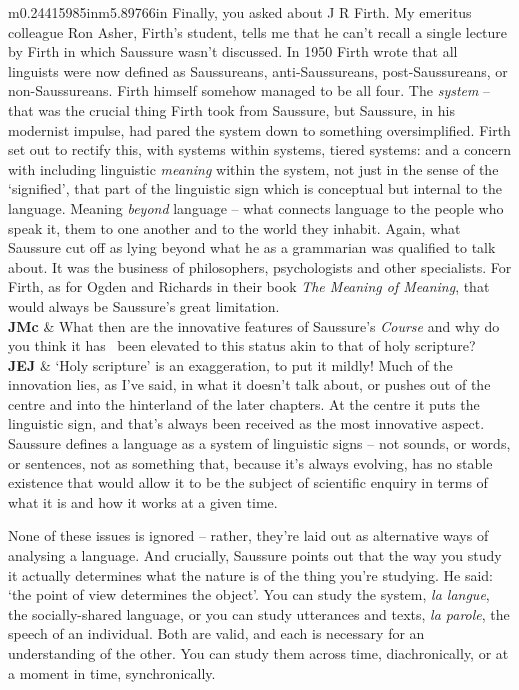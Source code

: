 \documentclass[12pt]{article}
\begin{document}
\begin{flushleft}
\begin{supertabular}{m{0.24415985in}m{5.89766in}}
Finally, you asked about J R Firth. My emeritus colleague Ron Asher, Firth’s student, tells me that he can’t recall a single lecture by Firth in which Saussure wasn’t discussed. In 1950 Firth wrote that all linguists were now defined as Saussureans, anti-Saussureans, post-Saussureans, or non-Saussureans. Firth himself somehow managed to be all four. The \textit{system} – that was the crucial thing Firth took from Saussure, but Saussure, in his modernist impulse, had pared the system down to something oversimplified. Firth set out to rectify this, with systems within systems, tiered systems: and a concern with including linguistic \textit{meaning} within the system, not just in the sense of the ‘signified’, that part of the linguistic sign which is conceptual but internal to the language. Meaning \textit{beyond} language – what connects language to the people who speak it, them to one another and to the world they inhabit. Again, what Saussure cut off as lying beyond what he as a grammarian was qualified to talk about. It was the business of philosophers, psychologists and other specialists. For Firth, as for Ogden and Richards in their book \textit{The Meaning of Meaning}, that would always be Saussure’s great limitation.\\
\textbf{JMc}\newline
 &
What then are the innovative features of Saussure’s \textit{Course} and why do you think it has \ been elevated to this status akin to that of holy scripture?\\
\textbf{JEJ}\newline
 &
‘Holy scripture’ is an exaggeration, to put it mildly! Much of the innovation lies, as I’ve said, in what it doesn’t talk about, or pushes out of the centre and into the hinterland of the later chapters. At the centre it puts the linguistic sign, and that’s always been received as the most innovative aspect. Saussure defines a language as a system of linguistic signs – not sounds, or words, or sentences, not as something that, because it’s always evolving, has no stable existence that would allow it to be the subject of scientific enquiry in terms of what it is and how it works at a given time. 

None of these issues is ignored – rather, they’re laid out as alternative ways of analysing a language. And crucially, Saussure points out that the way you study it actually determines what the nature is of the thing you’re studying. He said: ‘the point of view determines the object’. You can study the system, \textit{la langue}, the socially-shared language, or you can study utterances and texts, \textit{la parole}, the speech of an individual. Both are valid, and each is necessary for an understanding of the other. You can study them across time, diachronically, or at a moment in time, synchronically. 


\end{supertabular}
\end{flushleft}
\end{document}
